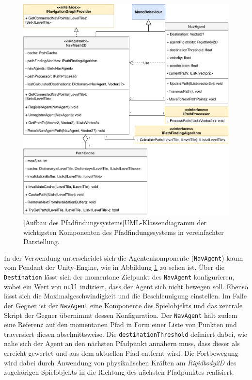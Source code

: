 \begin{figure}[h]
 \centering
 \includegraphics[width=0.835\linewidth]{diagrams/Pathfinding_Structure_reduced.pdf}
 [Aufbau des Pfadfindungssystems]{UML-Klassendiagramm der wichtigsten Komponenten des Pfadfindungssystems in vereinfachter Darstellung.}
	\label{fig:pathfinding_structure}
\end{figure}

In der Verwendung unterscheidet sich die Agentenkomponente (\texttt{NavAgent}) kaum vom  Pendant der Unity-Engine, wie in Abbildung \ref{fig:pathfinding_structure} zu sehen ist. Über die \texttt{Destination} lässt sich der momentane Zielpunkt des \texttt{NavAgent} konfigurieren, wobei ein Wert von \texttt{null} indiziert, dass der Agent sich nicht bewegen soll. Ebenso lässt sich die Maximalgeschwindigkeit und die Beschleunigung einstellen. Im Falle der Gegner ist der \texttt{NavAgent} eine Komponente des Spielobjekts und das zentrale Skript der Gegner übernimmt dessen Konfiguration. Der \texttt{NavAgent} hält zudem eine Referenz auf den momentanen Pfad in Form einer Liste von Punkten und traversiert diesen abschnittsweise. Die \texttt{destinationThreshold} definiert dabei, wie nahe sich der Agent an den nächsten Pfadpunkt annähern muss, dass dieser als erreicht gewertet und aus dem aktuellen Pfad entfernt wird. Die Fortbewegung wird dabei durch Anwendung von physikalischen Kräften am \textit{Rigidbody2D} des zugehörigen Spielobjekts in die Richtung des nächsten Pfadpunktes realisiert.

